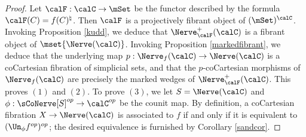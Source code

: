 \begin{proof}
Let $\calF: \calC \rightarrow \mSet$ be the functor described by the formula
$\calF(C) = f(C)^{\natural}$. Then $\calF$ is a projectively fibrant object of $(\mSet)^{\calC}$.
Invoking Proposition \ref{kudd}, we deduce that $\Nerve^{+}_{\calF}(\calC)$ is a fibrant object
of $\mset{ \Nerve(\calC)}$. Invoking Proposition \ref{markedfibrant}, we deduce that the underlying
map $p: \Nerve_{f}(\calC) \rightarrow \Nerve(\calC)$ is a coCartesian fibration of simplicial sets, and that
the $p$-coCartesian morphisms of $\Nerve_{f}(\calC)$ are precisely the marked wedges of
$\Nerve^{+}_{\calF}(\calC)$. This proves $(1)$ and $(2)$. To prove $(3)$, we let
$S = \Nerve(\calC)$ and $\phi: \sCoNerve[S]^{op} \rightarrow \calC^{op}$ be the counit map.
By definition, a coCartesian fibration $X \rightarrow \Nerve(\calC)$ is associated to $f$ if and only if
it is equivalent to $(\Un_{\phi} f^{op})^{op}$; the desired equivalence is furnished by Corollary \ref{sandcor}.




\end{proof}
